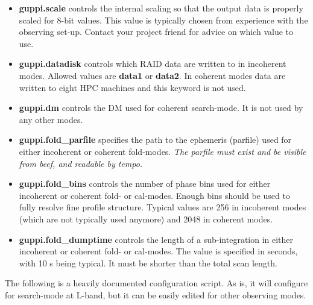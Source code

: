 \begin{itemize}
\item{\textbf{guppi.scale} controls the internal scaling so that the
    output data is properly scaled for 8-bit values.  This value is
    typically chosen from experience with the observing set-up.
    Contact your project friend for advice on which value to use.}
\item{\textbf{guppi.datadisk} controls which RAID data are written to
    in incoherent modes.  Allowed values are \textbf{data1} or
    \textbf{data2}.  In coherent modes data are written to eight HPC
    machines and this keyword is not used.}
\item{\textbf{guppi.dm} controls the DM used for coherent
    search-mode.  It is not used by any other modes.}
\item{\textbf{guppi.fold\_parfile} specifies the path to the ephemeris
    (parfile) used for either incoherent or coherent fold-modes.
    \emph{The parfile must exist and be visible from beef, and
      readable by tempo.}}
\item{\textbf{guppi.fold\_bins} controls the number of phase bins used
    for either incoherent or coherent fold- or cal-modes.  Enough bins
    should be used to fully resolve fine profile structure.  Typical
    values are 256 in incoherent modes (which are not typically used
    anymore) and 2048 in coherent modes.}
\item{\textbf{guppi.fold\_dumptime} controls the length of a
    sub-integration in either incoherent or coherent fold- or
    cal-modes.  The value is specified in seconds, with 10 s being
    typical.  It must be shorter than the total scan length.}
\end{itemize} 

The following is a heavily documented configuration script.  As is, it
will configure for search-mode at L-band, but it can be easily edited
for other observing modes.


